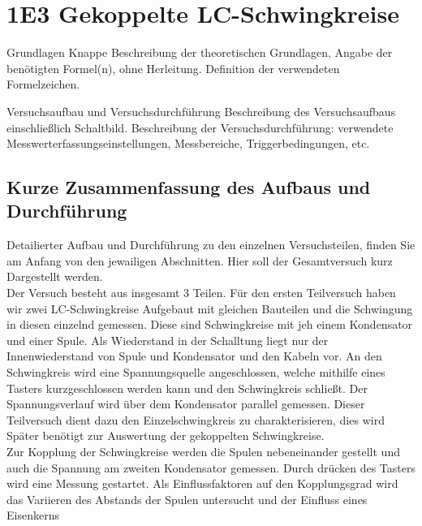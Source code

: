 \documentclass[twoside]{protokoll}
\begin{document}
 
\section{1E3 Gekoppelte LC-Schwingkreise}

\begin{aufgabe}{Grundlagen}
  Knappe Beschreibung der theoretischen Grundlagen, Angabe der
  benötigten Formel(n), ohne Herleitung. Definition der verwendeten
  Formelzeichen.
\end{aufgabe}

\begin{aufgabe}{Versuchsaufbau und Versuchsdurchführung}
  Beschreibung des Versuchsaufbaus einschließlich
  Schaltbild. Beschreibung der Versuchsdurchführung: verwendete
  Messwerterfassungseinstellungen, Messbereiche, Triggerbedingungen,
  etc.
\end{aufgabe}

\subsection{Kurze Zusammenfassung des Aufbaus und Durchführung}

Detailierter Aufbau und Durchführung zu den einzelnen Versuchsteilen, finden Sie am Anfang von den jewailigen Abschnitten. 
Hier soll der Gesamtversuch kurz Dargestellt werden.\\

Der Versuch besteht aus insgesamt 3 Teilen. Für den ersten Teilversuch haben wir zwei LC-Schwingkreise Aufgebaut mit gleichen Bauteilen und die Schwingung in diesen einzelnd gemessen. 
Diese sind Schwingkreise mit jeh einem Kondensator und einer Spule.
Als Wiederstand in der Schalltung liegt nur der Innenwiederstand von Spule und Kondensator und den Kabeln vor. 
An den Schwingkreis wird eine Spannungsquelle angeschlossen, welche mithilfe eines Tasters kurzgeschlossen werden kann und den Schwingkreis schließt. 
Der Spannungsverlauf wird über dem Kondensator parallel gemessen. 
Dieser Teilversuch dient dazu den Einzelschwingkreis zu charakterisieren, dies wird Später benötigt zur Auswertung der gekoppelten Schwingkreise.\\

Zur Kopplung der Schwingkreise werden die Spulen nebeneinander gestellt und auch die Spannung am zweiten Kondensator gemessen. Durch drücken des Tasters wird eine Messung gestartet.
Als Einflussfaktoren auf den Kopplungsgrad wird das Variieren des Abstands der Spulen untersucht und der Einfluss eines Eisenkerns\\
\end{document}
